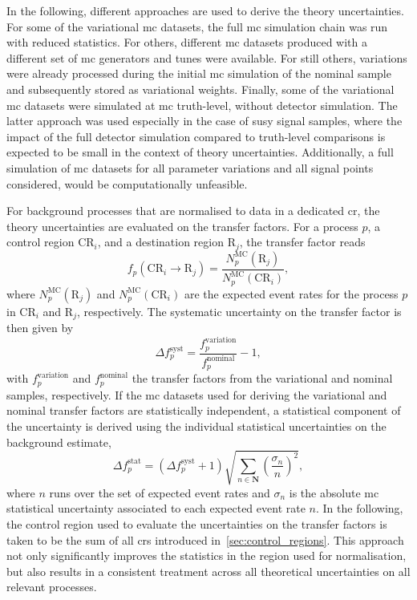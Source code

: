 In the following, different approaches are used to derive the theory uncertainties. For some of the variational \gls{mc} datasets, the full \gls{mc} simulation chain was run with reduced statistics. For others, different \gls{mc} datasets produced with a different set of \gls{mc} generators and tunes were available. For still others, variations were already processed during the initial \gls{mc} simulation of the nominal sample and subsequently stored as variational weights. Finally, some of the variational \gls{mc} datasets were simulated at \gls{mc} truth-level, \ie without detector simulation. The latter approach was used especially in the case of \gls{susy} signal samples, where the impact of the full detector simulation compared to truth-level comparisons is expected to be small in the context of theory uncertainties. Additionally, a full simulation of \gls{mc} datasets for all parameter variations and all signal points considered, would be computationally unfeasible. 

For background processes that are normalised to data in a dedicated \gls{cr}, the theory uncertainties are evaluated on the transfer factors. For a process $p$, a control region CR$_i$, and a destination region R$_j$, the transfer factor reads
\begin{equation}
	f_p(\mathrm{CR}_i\rightarrow \mathrm{R}_j) = \frac{N^\mathrm{MC}_p(\mathrm{R}_j)}{N^\mathrm{MC}_p(\mathrm{CR}_i)},
\end{equation}
where $N^\mathrm{MC}_p(\mathrm{R}_j)$ and $N^\mathrm{MC}_p(\mathrm{CR}_i)$ are the expected event rates for the process $p$ in CR$_i$ and R$_j$, respectively. The systematic uncertainty on the transfer factor is then given by
\begin{equation}
	\Delta f_p^\mathrm{syst} = \frac{f_p^\mathrm{variation}}{f_p^\mathrm{nominal}} - 1,
\end{equation}
with $f_p^\mathrm{variation}$ and $f_p^\mathrm{nominal}$ the transfer factors from the variational and nominal samples, respectively. If the \gls{mc} datasets used for deriving the variational and nominal transfer factors are statistically independent, a statistical component of the uncertainty is derived using the individual statistical uncertainties on the background estimate,
\begin{equation}
	\Delta f_p^\mathrm{stat} = (\Delta f_p^\mathrm{syst} + 1 ) \sqrt{\sum_{n\in\boldsymbol{N}}(\frac{\sigma_n}{n})^2},
\end{equation}
 where $n$ runs over the set of expected event rates and $\sigma_n$ is the absolute \gls{mc} statistical uncertainty associated to each expected event rate $n$. In the following, the control region used to evaluate the uncertainties on the transfer factors is taken to be the sum of all \glspl{cr} introduced in~\cref{sec:control_regions}. This approach not only significantly improves the statistics in the region used for normalisation, but also results in a consistent treatment across all theoretical uncertainties on all relevant processes.
 
